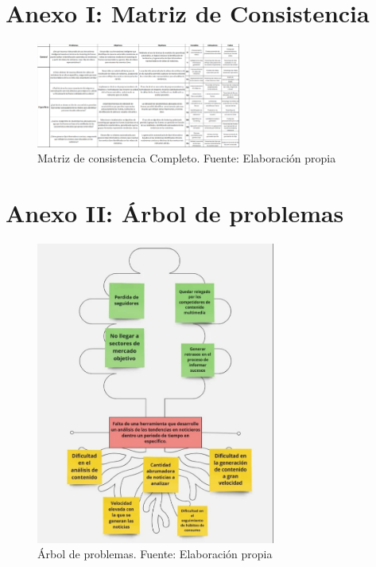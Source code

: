 \chapter{Anexo I: Matriz de Consistencia}

\begin{figure}[h]
	\begin{center}
		\includegraphics[angle=90, width=0.6\textwidth]{images_repo/matriz-consistecia.png}
		\caption{Matriz de consistencia Completo. Fuente: Elaboración propia}
		\label{1:fig 13}
	\end{center}
\end{figure}
\chapter{Anexo II: Árbol de problemas}
\begin{figure}[h]
	\begin{center}
		\includegraphics[width=0.7\textwidth]{images_repo/arbol_problemas.png}
		\caption{Árbol de problemas. Fuente: Elaboración propia}
		\label{1:fig 14}
	\end{center}
\end{figure}








